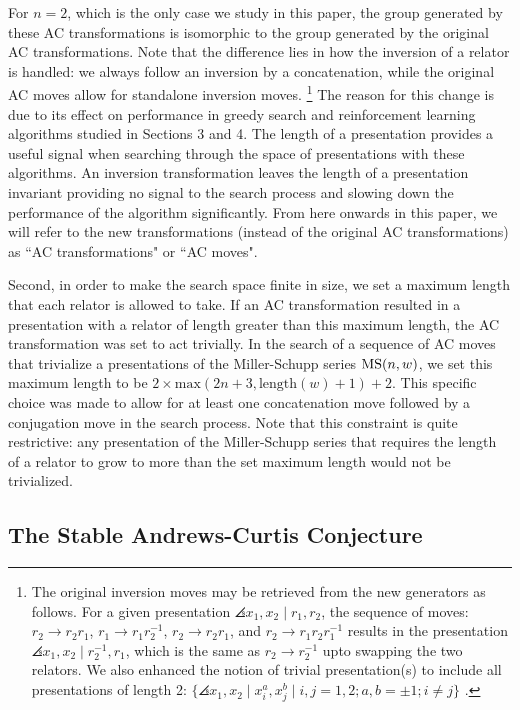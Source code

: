 For $n=2$, which is the only case we study in this paper, the group generated by these AC transformations is isomorphic to the group generated by the original AC transformations. Note that the difference lies in how the inversion of a relator is handled: we always follow an inversion by a concatenation, while the original AC moves allow for standalone inversion moves. 
\footnote{The original inversion moves may be retrieved from the new generators as follows. For a given presentation $\angles{x_1, x_2 \mid r_1, r_2}$, the sequence of moves: $r_2 \to r_2 r_1$, $r_1 \to r_1 r_2^{-1}$, $r_2 \to r_2 r_1$, and $r_2 \to r_1 r_2 r_1^{-1}$ results in the presentation $\angles{x_1, x_2 \mid r_2^{-1}, r_1}$, which is the same as $r_2 \to r_2^{-1}$ upto swapping the two relators. We also enhanced the notion of trivial presentation(s) to include all presentations of length 2: $\{\angles{x_1, x_2 \mid x_i^{a}, x_j^{b}}  \mid i, j = 1, 2; a, b = \pm 1; i \neq j \}$ .
}
The reason for this change is due to its effect on performance in greedy search and reinforcement learning algorithms studied in Sections 3 and 4. The length of a presentation provides a useful signal when searching through the space of presentations with these algorithms. An inversion transformation leaves the length of a presentation invariant providing no signal to the search process and slowing down the performance of the algorithm significantly. 
From here onwards in this paper, we will refer to the new transformations (instead of the original AC transformations) as  ``AC transformations" or ``AC moves".
\newline

Second, in order to make the search space finite in size, we set a maximum length that each relator is allowed to take. If an AC transformation resulted in a presentation with a relator of length greater than this maximum length, the AC transformation was set to act trivially. In the search of a sequence of AC moves that trivialize a presentations of the Miller-Schupp series $\text{MS}(n, w)$, we set this maximum length to be $2 \times \text{max}(2 n+3, \text{length}(w)+1) + 2$. This specific choice was made to allow for at least one concatenation move followed by a conjugation move in the search process. Note that this constraint is quite restrictive: any presentation of the Miller-Schupp series that requires the length of a relator to grow to more than the set maximum length would not be trivialized. 

\subsection*{The Stable Andrews-Curtis Conjecture}

